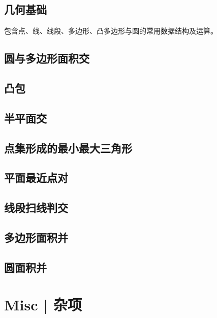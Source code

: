 \documentclass[8pt,a4paper]{article}
\newcommand{\code}[1]{
    
}
\newcommand{\txt}[1]{\par\noindent\footnotesize #1}
\begin{document}
\begin{multicols}{2}
    \subsection{几何基础}
        \txt{包含点、线、线段、多边形、凸多边形与圆的常用数据结构及运算。}
        \code{src/computational_geometry/geometry_base.cpp}
    \subsection{圆与多边形面积交}
        \code{src/computational_geometry/circle_polygon_area.cpp}
    \subsection{凸包}
        \code{src/computational_geometry/convex_hull.cpp}
    \subsection{半平面交}
        \code{src/computational_geometry/halfplane_intersection.cpp}
    \subsection{点集形成的最小最大三角形}
        \code{src/computational_geometry/minmax_triangle.cpp}
    \subsection{平面最近点对}
        \code{src/computational_geometry/closest_pair.cpp}
    \subsection{线段扫线判交}
        \code{src/computational_geometry/segment_sweep_intersection.cpp}
    \subsection{多边形面积并}
        \code{src/computational_geometry/polygon_union.cpp}
    \subsection{圆面积并}
        \code{src/computational_geometry/circle_union.cpp}

\section{Misc | 杂项}


\end{multicols}
\end{document}
